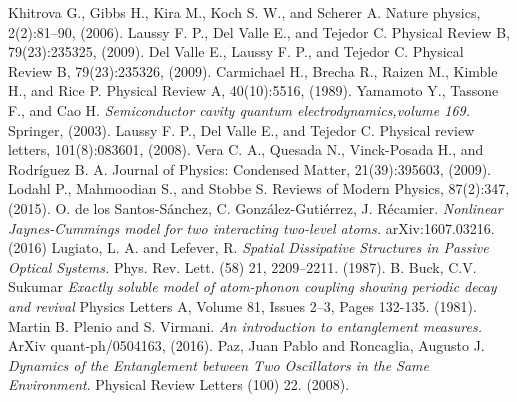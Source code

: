 \begin{thebibliography}{9}
Khitrova G., Gibbs H., Kira M., Koch S. W., and Scherer A. Nature physics, 2(2):81–90, (2006).
Laussy F. P., Del Valle E., and Tejedor C. Physical Review B, 79(23):235325, (2009).
 Del Valle E., Laussy F. P., and Tejedor C. Physical Review B, 79(23):235326, (2009).
Carmichael H., Brecha R., Raizen M., Kimble H., and Rice P. Physical Review A, 40(10):5516, (1989).
Yamamoto Y., Tassone F., and Cao H. 
\textit{Semiconductor cavity quantum electrodynamics,volume 169.}
Springer, (2003).
Laussy F. P., Del Valle E., and Tejedor C. Physical review letters, 101(8):083601, (2008).
 Vera C. A., Quesada N., Vinck-Posada H., and Rodríguez B. A. Journal of Physics: Condensed Matter, 21(39):395603, (2009).
Lodahl P., Mahmoodian S., and Stobbe S. Reviews of Modern Physics, 87(2):347, (2015).
O. de los Santos-Sánchez, C. González-Gutiérrez, J. Récamier. \textit{Nonlinear Jaynes-Cummings model for two interacting two-level atoms.} arXiv:1607.03216. (2016)
Lugiato, L. A. and Lefever, R. \textit{Spatial Dissipative Structures in Passive Optical Systems.} Phys. Rev. Lett. (58) 21, 2209--2211. (1987).
B. Buck, C.V. Sukumar \textit{Exactly soluble model of atom-phonon coupling showing periodic decay and revival} Physics Letters A, Volume 81, Issues 2–3,  Pages 132-135. (1981).
Martin B. Plenio and S. Virmani. 
\textit{An introduction to entanglement measures.}
ArXiv quant-ph/0504163, (2016).
Paz, Juan Pablo and Roncaglia, Augusto J. \textit{Dynamics of the Entanglement between Two Oscillators in the Same Environment}. Physical Review Letters (100) 22. (2008). 






\end{thebibliography}
